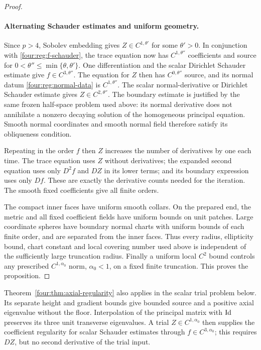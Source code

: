 \begin{proof}
\paragraph{Alternating Schauder estimates and uniform geometry.}
Since $p>4$, Sobolev embedding gives $Z\in C^{1,\theta'}$ for
some $\theta'>0$.  In conjunction with \eqref{four:reg:f-schauder},
the trace equation now has $C^{1,\theta''}$ coefficients and source
for $0<\theta''\le\min\{\theta,\theta'\}$.  One differentiation
and the scalar Dirichlet Schauder estimate give
$f\in C^{3,\theta''}$.  The equation for $Z$ then has
$C^{0,\theta''}$ source, and its normal datum
\eqref{four:reg:normal-data} is $C^{1,\theta''}$.
The scalar normal-derivative or Dirichlet Schauder estimate gives
$Z\in C^{2,\theta''}$.  The boundary estimate is justified by the
same frozen half-space problem used above: its normal derivative
does not annihilate a nonzero decaying solution of the homogeneous
principal equation.  Smooth normal coordinates and smooth normal
field therefore satisfy its obliqueness condition.

Repeating in the order $f$ then $Z$ increases the number of
derivatives by one each time.  The trace equation uses $Z$ without
derivatives; the expanded second equation uses only $D^2f$ and
$DZ$ in its lower terms; and its boundary expression uses only
$Df$.  These are exactly the derivative counts needed for the
iteration.  The smooth fixed coefficients give all finite orders.

The compact inner faces have uniform smooth collars.  On the
prepared end, the metric and all fixed coefficient fields have
uniform bounds on unit patches.  Large coordinate spheres have
boundary normal charts with uniform bounds of each finite order,
and are separated from the inner faces.  Thus every radius,
ellipticity bound, chart constant and local covering number used
above is independent of the sufficiently large truncation radius.
Finally a uniform local $C^2$ bound controls any prescribed
$C^{1,\alpha_0}$ norm, $\alpha_0<1$, on a fixed finite truncation.
This proves the proposition.
\end{proof}

\begin{remark}\label{four:reg:scalar-trial-interface}
Theorem~\ref{four:thm:axial-regularity} also applies in the scalar trial
problem below. Its separate height and gradient bounds give bounded
source and a positive axial eigenvalue without the floor. Interpolation
of the principal matrix with $\operatorname{Id}$ preserves its three unit transverse
eigenvalues. A trial $Z\in C^{1,\alpha_0}$ then supplies the coefficient
regularity for scalar Schauder estimates through $f\in C^{3,\alpha_0}$;
this requires $DZ$, but no second derivative of the trial input.
\end{remark}
